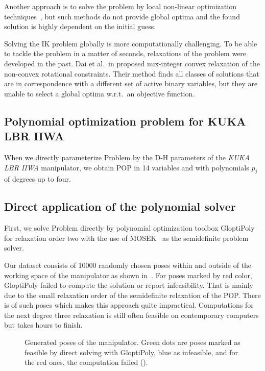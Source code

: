 Another approach is to solve the problem by local non-linear optimization techniques~\cite{Buss2004}, but such methods do not provide global optima and the found solution is highly dependent on the initial guess.

Solving the IK problem globally is more computationally challenging. To be able to tackle the problem in a matter of seconds, relaxations of the problem were developed in the past. Dai et al.\ in \cite{Dai2019} proposed mix-integer convex relaxation of the non-convex rotational constraints. Their method finds all classes of solutions that are in correspondence with a different set of active binary variables, but they are unable to select a global optima w.r.t.\ an objective function.

\subsection{Polynomial optimization problem for KUKA LBR IIWA}
When we directly parameterize Problem  by the D-H parameters of the \textit{KUKA LBR IIWA} manipulator, we obtain POP in 14 variables and with polynomials $p_j$ of degrees up to four.

\subsection{Direct application of the polynomial solver}
First, we solve Problem  directly by polynomial optimization toolbox GloptiPoly~\cite{gloptipoly} for relaxation order two with the use of MOSEK~\cite{mosek} as the semidefinite problem solver.

Our dataset consists of \num{10000} randomly chosen poses within and outside of the working space of the manipulator as shown in~. For poses marked by red color, GloptiPoly failed to compute the solution or report infeasibility. That is mainly due to the small relaxation order of the semidefinite relaxation of the POP. There is \gloptipolyFailed{} of such poses which makes this approach quite impractical. Computations for the next degree three relaxation is still often feasible on contemporary computers but takes hours to finish.

\begin{figure}[ht]
  \centering
  \resizebox{0.75\textwidth}{!}{
    
  }
  \caption{Generated poses of the manipulator. Green dots are poses marked as feasible by direct solving with GloptiPoly, blue as infeasible, and for the red ones, the computation failed (\gloptipolyFailed).}
\end{figure}

